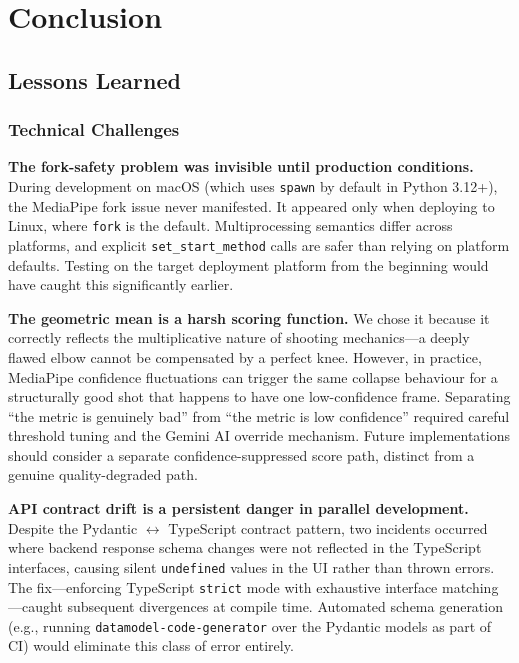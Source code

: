 \chapter{Conclusion}
\label{chap:conclusion}

\section{Lessons Learned}
\label{sec:lessons_learned}

\subsection{Technical Challenges}

\textbf{The fork-safety problem was invisible until production conditions.}
During development on macOS (which uses \lstinline|spawn| by default in Python 3.12+), the MediaPipe fork issue never manifested. It appeared only when deploying to Linux, where \lstinline|fork| is the default. Multiprocessing semantics differ across platforms, and explicit \lstinline|set_start_method| calls are safer than relying on platform defaults. Testing on the target deployment platform from the beginning would have caught this significantly earlier.

\textbf{The geometric mean is a harsh scoring function.}
We chose it because it correctly reflects the multiplicative nature of shooting mechanics---a deeply flawed elbow cannot be compensated by a perfect knee. However, in practice, MediaPipe confidence fluctuations can trigger the same collapse behaviour for a structurally good shot that happens to have one low-confidence frame. Separating ``the metric is genuinely bad'' from ``the metric is low confidence'' required careful threshold tuning and the Gemini AI override mechanism. Future implementations should consider a separate confidence-suppressed score path, distinct from a genuine quality-degraded path.

\textbf{API contract drift is a persistent danger in parallel development.}
Despite the Pydantic $\leftrightarrow$ TypeScript contract pattern, two incidents occurred where backend response schema changes were not reflected in the TypeScript interfaces, causing silent \lstinline|undefined| values in the UI rather than thrown errors. The fix---enforcing TypeScript \lstinline|strict| mode with exhaustive interface matching---caught subsequent divergences at compile time. Automated schema generation (e.g., running \lstinline|datamodel-code-generator| over the Pydantic models as part of CI) would eliminate this class of error entirely.

